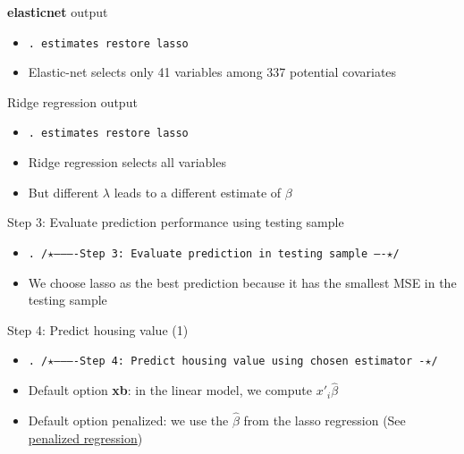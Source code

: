 \documentclass{beamer}
\begin{document}
\begin{frame}{\textbf{elasticnet} output}
	\begin{itemize}
		\item [] \small{\texttt{. estimates restore lasso}}
	\end{itemize}
	\begin{itemize}
		\item Elastic-net selects only 41 variables among 337 potential covariates
	\end{itemize}
\end{frame}

\begin{frame}{Ridge regression output}
	\begin{itemize}
		\item [] \small{\texttt{. estimates restore lasso}}
	\end{itemize}
	\begin{itemize}
		\item Ridge regression selects all variables
		\item But different $\lambda$ leads to a different estimate of $\beta$
	\end{itemize}
\end{frame}

\begin{frame}{Step 3: Evaluate prediction performance using testing sample}
	\begin{itemize}
		\item [] \small{\texttt{. /$\star$----------Step 3: Evaluate prediction in testing sample ----$\star$/}}
	\end{itemize}
	\begin{itemize}
		\item We choose lasso as the best prediction because it has the smallest MSE in the testing sample
	\end{itemize}
\end{frame}

\begin{frame}{Step 4: Predict housing value (1)}
	\label{prediction example}
	\begin{itemize}
		\item [] \small{\texttt{. /$\star$----------Step 4: Predict housing value using chosen estimator -$\star$/}}
	\end{itemize}
	\begin{itemize}
		\item Default option \textbf{xb}: in the linear model, we compute $x'_i\hat{\beta}$
		\item Default option penalized: we use the $\hat{\beta}$ from the lasso regression (See \hyperlink{penalized regression}{penalized regression})
	\end{itemize}
\end{frame}
\end{document}
